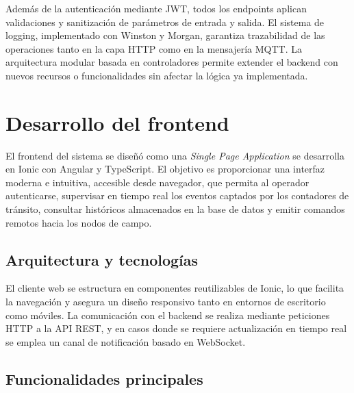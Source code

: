 Además de la autenticación mediante JWT, todos los endpoints aplican validaciones y sanitización de parámetros de entrada y salida. El sistema de logging, implementado con Winston y Morgan, garantiza trazabilidad de las operaciones tanto en la capa HTTP como en la mensajería MQTT. La arquitectura modular basada en controladores permite extender el backend con nuevos recursos o funcionalidades sin afectar la lógica ya implementada.


\section{Desarrollo del frontend}

El frontend del sistema se diseñó como una \textit{Single Page Application} se desarrolla en Ionic con Angular y TypeScript.  
El objetivo es proporcionar una interfaz moderna e intuitiva, accesible desde navegador, que permita al operador autenticarse, supervisar en tiempo real los eventos captados por los contadores de tránsito, consultar históricos almacenados en la base de datos y emitir comandos remotos hacia los nodos de campo.  

\subsection{Arquitectura y tecnologías}

El cliente web se estructura en componentes reutilizables de Ionic, lo que facilita la navegación y asegura un diseño responsivo tanto en entornos de escritorio como móviles.  
La comunicación con el backend se realiza mediante peticiones HTTP a la API REST, y en casos donde se requiere actualización en tiempo real se emplea un canal de notificación basado en WebSocket.


\subsection{Funcionalidades principales}

